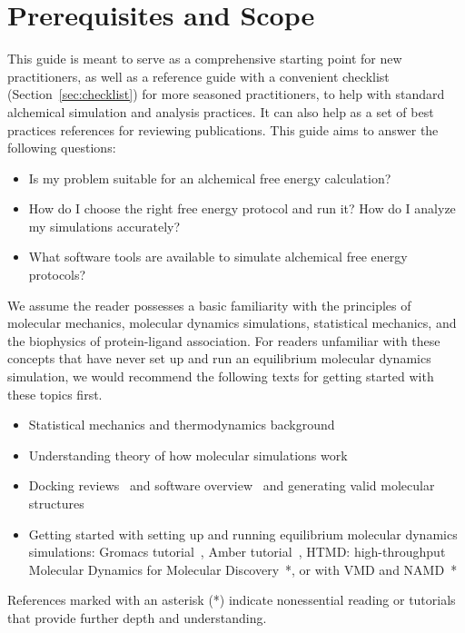 \documentclass[9pt,bestpractices]{livecoms}
\begin{document}
\section{Prerequisites and Scope}
\label{sec:pre}
This guide is meant to serve as a comprehensive starting point for new practitioners, as well as a reference guide with a convenient checklist (Section~\ref{sec:checklist}) for more seasoned practitioners, to help with standard alchemical simulation and analysis practices. It can also help as a set of best practices references for reviewing publications. 
This guide aims to answer the following questions:
\begin{itemize}
    \item Is my problem suitable for an alchemical free energy calculation? 
    \item How do I choose the right free energy protocol and run it? How do I analyze my simulations accurately? 
    \item What software tools are available to simulate alchemical free energy protocols? 
\end{itemize}

We assume the reader possesses a basic familiarity with the principles of molecular mechanics, molecular dynamics simulations, statistical mechanics, and the biophysics of protein-ligand association.
For readers unfamiliar with these concepts that have never set up and run an equilibrium molecular dynamics simulation, we would recommend the following texts for getting started with these topics first. 
\begin{itemize}
    \item Statistical mechanics and thermodynamics background~\cite{hill1956statistical, alavi2011statistical}
    \item Understanding theory of how molecular simulations work~\cite{frenkel2002understanding}
    \item Docking reviews~\cite{yuriev2013latest, meng2011molecular} and software overview~\cite{pagadala2017software} and generating valid molecular structures ~\cite{loeffler2015fesetup}
    \item Getting started with setting up and running equilibrium molecular dynamics simulations: Gromacs tutorial~\cite{lemkul2018From}, Amber tutorial~\cite{amber}, HTMD: high-throughput Molecular Dynamics for Molecular Discovery~\cite{doerr2016htmd}*, or with VMD and NAMD~\cite{ribeiro2016easy}*
\end{itemize}
References marked with an asterisk (*) indicate nonessential reading or tutorials that provide further depth and understanding.
\end{document}
